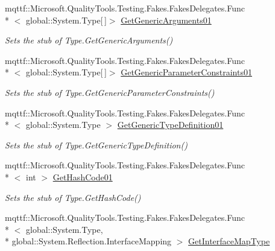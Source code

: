 \begin{DoxyCompactItemize}
mqttf\-::\-Microsoft.\-Quality\-Tools.\-Testing.\-Fakes.\-Fakes\-Delegates.\-Func\\*
$<$ global\-::\-System.\-Type\mbox{[}$\,$\mbox{]}$>$ \hyperlink{class_system_1_1_reflection_1_1_fakes_1_1_stub_type_delegator_a94865b4b57444c2499604d1c3dacc7d3}{Get\-Generic\-Arguments01}
\begin{DoxyCompactList}\small\item\em Sets the stub of Type.\-Get\-Generic\-Arguments()\end{DoxyCompactList}\item 
mqttf\-::\-Microsoft.\-Quality\-Tools.\-Testing.\-Fakes.\-Fakes\-Delegates.\-Func\\*
$<$ global\-::\-System.\-Type\mbox{[}$\,$\mbox{]}$>$ \hyperlink{class_system_1_1_reflection_1_1_fakes_1_1_stub_type_delegator_a18e0892d41b5dfb1d5ceb649a1f574c8}{Get\-Generic\-Parameter\-Constraints01}
\begin{DoxyCompactList}\small\item\em Sets the stub of Type.\-Get\-Generic\-Parameter\-Constraints()\end{DoxyCompactList}\item 
mqttf\-::\-Microsoft.\-Quality\-Tools.\-Testing.\-Fakes.\-Fakes\-Delegates.\-Func\\*
$<$ global\-::\-System.\-Type $>$ \hyperlink{class_system_1_1_reflection_1_1_fakes_1_1_stub_type_delegator_a7a78a8783d2a2000798ee06f945bebcd}{Get\-Generic\-Type\-Definition01}
\begin{DoxyCompactList}\small\item\em Sets the stub of Type.\-Get\-Generic\-Type\-Definition()\end{DoxyCompactList}\item 
mqttf\-::\-Microsoft.\-Quality\-Tools.\-Testing.\-Fakes.\-Fakes\-Delegates.\-Func\\*
$<$ int $>$ \hyperlink{class_system_1_1_reflection_1_1_fakes_1_1_stub_type_delegator_ac180ca5b884dd567b90b061641974e0d}{Get\-Hash\-Code01}
\begin{DoxyCompactList}\small\item\em Sets the stub of Type.\-Get\-Hash\-Code()\end{DoxyCompactList}\item 
mqttf\-::\-Microsoft.\-Quality\-Tools.\-Testing.\-Fakes.\-Fakes\-Delegates.\-Func\\*
$<$ global\-::\-System.\-Type, \\*
global\-::\-System.\-Reflection.\-Interface\-Mapping $>$ \hyperlink{class_system_1_1_reflection_1_1_fakes_1_1_stub_type_delegator_a4d0f29c70850e6302f6059dc9917ebb5}{Get\-Interface\-Map\-Type}

\end{DoxyCompactItemize}
